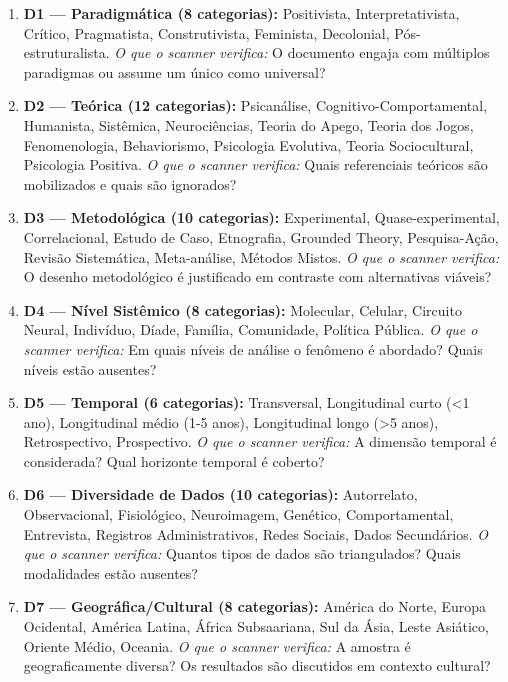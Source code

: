 \begin{enumerate}
  \item \textbf{D1 — Paradigmática (8 categorias):} Positivista, Interpretativista, Crítico, Pragmatista, Construtivista, Feminista, Decolonial, Pós-estruturalista. \textit{O que o scanner verifica:} O documento engaja com múltiplos paradigmas ou assume um único como universal?

  \item \textbf{D2 — Teórica (12 categorias):} Psicanálise, Cognitivo-Comportamental, Humanista, Sistêmica, Neurociências, Teoria do Apego, Teoria dos Jogos, Fenomenologia, Behaviorismo, Psicologia Evolutiva, Teoria Sociocultural, Psicologia Positiva. \textit{O que o scanner verifica:} Quais referenciais teóricos são mobilizados e quais são ignorados?

  \item \textbf{D3 — Metodológica (10 categorias):} Experimental, Quase-experimental, Correlacional, Estudo de Caso, Etnografia, Grounded Theory, Pesquisa-Ação, Revisão Sistemática, Meta-análise, Métodos Mistos. \textit{O que o scanner verifica:} O desenho metodológico é justificado em contraste com alternativas viáveis?

  \item \textbf{D4 — Nível Sistêmico (8 categorias):} Molecular, Celular, Circuito Neural, Indivíduo, Díade, Família, Comunidade, Política Pública. \textit{O que o scanner verifica:} Em quais níveis de análise o fenômeno é abordado? Quais níveis estão ausentes?

  \item \textbf{D5 — Temporal (6 categorias):} Transversal, Longitudinal curto (<1 ano), Longitudinal médio (1-5 anos), Longitudinal longo (>5 anos), Retrospectivo, Prospectivo. \textit{O que o scanner verifica:} A dimensão temporal é considerada? Qual horizonte temporal é coberto?

  \item \textbf{D6 — Diversidade de Dados (10 categorias):} Autorrelato, Observacional, Fisiológico, Neuroimagem, Genético, Comportamental, Entrevista, Registros Administrativos, Redes Sociais, Dados Secundários. \textit{O que o scanner verifica:} Quantos tipos de dados são triangulados? Quais modalidades estão ausentes?

  \item \textbf{D7 — Geográfica/Cultural (8 categorias):} América do Norte, Europa Ocidental, América Latina, África Subsaariana, Sul da Ásia, Leste Asiático, Oriente Médio, Oceania. \textit{O que o scanner verifica:} A amostra é geograficamente diversa? Os resultados são discutidos em contexto cultural?


\end{enumerate}
